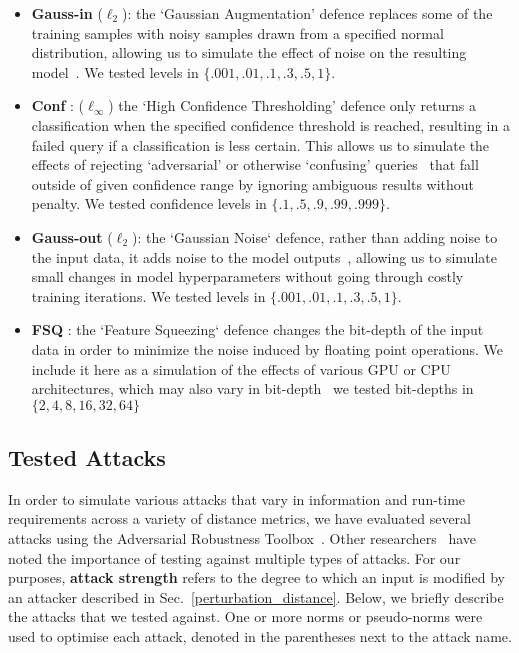 \begin{itemize}
    \item \textbf{Gauss-in} ($\ell_2$): the `Gaussian Augmentation' defence replaces some of the training samples with noisy samples drawn from a specified normal distribution, allowing us to simulate the effect of noise  on the resulting model~\citep{gauss_aug}. We tested levels in $\{.001, .01, .1, .3, .5, 1\}$.
    \item \textbf{Conf} : ($\ell_{\infty}$) the `High Confidence Thresholding' defence only returns a classification when the specified confidence threshold is reached, resulting in a failed query if a classification is less certain. This allows us to simulate the effects of rejecting `adversarial' or otherwise `confusing' queries~\citep{high_conf} that fall outside of given confidence range by ignoring ambiguous results without penalty. We tested confidence levels in $\{.1, .5, .9, .99, .999\}$.
    \item \textbf{Gauss-out} ($\ell_2$): the `Gaussian Noise` defence, rather than adding noise to the input data, it adds  noise to the model outputs~\citep{gauss_out}, allowing us to simulate small changes in model hyperparameters without going through costly training iterations. We tested levels in $\{.001, .01, .1, .3, .5, 1\}$.
    \item \textbf{FSQ} : the `Feature Squeezing` defence changes the bit-depth of the input data in order to minimize the noise induced by floating point operations. We include it here as a simulation of the effects of various GPU or CPU architectures, which may also vary in bit-depth~\citep{feature_squeezing} we tested bit-depths in $\{2, 4, 8, 16, 32, 64\}$
\end{itemize}

\subsection{Tested Attacks}
\label{attacks}
In order to simulate various attacks that vary in information and run-time requirements across a variety of distance metrics, we have evaluated several attacks using the Adversarial Robustness Toolbox~\citep{art2018}. Other researchers~\citep{carlini_towards_2017} have noted the importance of testing against multiple types of attacks. For our purposes, \textbf{attack strength} refers to the degree to which an input is modified by an attacker described in Sec.~\ref{perturbation_distance}. Below, we briefly describe the attacks that we tested against. One or more norms or pseudo-norms were used to optimise each attack, denoted in the parentheses next to the attack name.

